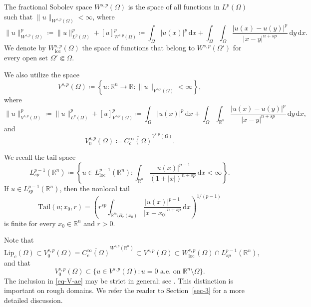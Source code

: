 \documentclass[11pt]{amsart}
\theoremstyle{plain}
\theoremstyle{definition}
\numberwithin{equation}{section}
\begin{document}
The fractional Sobolev space $W^{s, p}(\Omega)$ is the space of all functions in $L^p(\Omega)$ such that $\|u\|_{W^{s, p}(\Omega)} < \infty$, where
\begin{equation*}
\|u\|_{W^{s, p}(\Omega)}^p \coloneqq \|u\|_{L^p(\Omega)}^p + [u]_{W^{s, p}(\Omega)}^p \coloneqq \int_{\Omega} |u(x)|^p \,\mathrm{d}x + \int_{\Omega} \int_{\Omega} \frac{|u(x)-u(y)|^p}{|x-y|^{n+sp}} \,\mathrm{d}y \,\mathrm{d}x.
\end{equation*}
We denote by $W^{s, p}_{\mathrm{loc}}(\Omega)$ the space of functions that belong to $W^{s, p}(\Omega')$ for every open set $\Omega' \Subset \Omega$.

We also utilize the space
\begin{equation*}
V^{s, p}(\Omega) \coloneqq \left\{ u: \mathbb{R}^n \to \mathbb{R}: \|u\|_{V^{s, p}(\Omega)} < \infty \right\},
\end{equation*}
where
\begin{equation*}
\|u\|_{V^{s, p}(\Omega)}^p \coloneqq \|u\|_{L^p(\Omega)}^p + [u]_{V^{s, p}(\Omega)}^p \coloneqq \int_{\Omega} |u(x)|^p \,\mathrm{d}x + \int_{\Omega} \int_{\mathbb{R}^n} \frac{|u(x)-u(y)|^p}{|x-y|^{n+sp}} \,\mathrm{d}y \,\mathrm{d}x,
\end{equation*}
and
\begin{equation*}
V^{s, p}_0(\Omega) \coloneqq \overline{C_c^\infty(\Omega)}^{V^{s, p}(\Omega)}.
\end{equation*}

We recall the tail space
\begin{equation*}
L^{p-1}_{sp}(\mathbb{R}^n) \coloneqq \left\{ u \in L^{p-1}_{\mathrm{loc}}(\mathbb{R}^n): \int_{\mathbb{R}^n} \frac{|u(x)|^{p-1}}{(1+|x|)^{n+sp}} \,\mathrm{d}x < \infty \right\}.
\end{equation*}
If $u \in L^{p-1}_{sp}(\mathbb{R}^n)$, then the nonlocal tail
\begin{equation*}
\mathrm{Tail}(u; x_0, r) = \left( r^{sp} \int_{\mathbb{R}^n \setminus B_r(x_0)} \frac{|u(x)|^{p-1}}{|x-x_0|^{n+sp}} \,\mathrm{d}x \right)^{1/(p-1)}
\end{equation*}
is finite for every $x_0 \in \mathbb{R}^n$ and $r>0$.

Note that
\begin{equation*}
\mathrm{Lip}_c(\Omega) \subset V^{s, p}_0(\Omega) = \overline{C_c^\infty(\Omega)}^{W^{s, p}(\mathbb{R}^n)} \subset V^{s, p}(\Omega) \subset W^{s, p}_{\mathrm{loc}}(\Omega) \cap L^{p-1}_{sp}(\mathbb{R}^n),
\end{equation*}
and that
\begin{equation}\label{eq-V-ae}
V^{s, p}_0(\Omega) \subset \{ u \in V^{s, p}(\Omega): u=0 \text{ a.e.\ on } \mathbb{R}^n \setminus \Omega \}.
\end{equation}
The inclusion in \eqref{eq-V-ae} may be strict in general; see \cite{FSV15}. This distinction is important on rough domains. We refer the reader to Section~\ref{sec-3} for a more detailed discussion.
\end{document}
